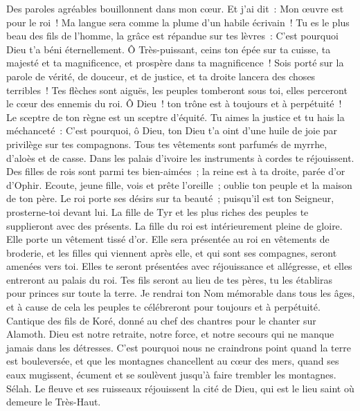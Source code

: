 \begin{multicols}{2}
Des paroles agréables bouillonnent dans mon cœur. Et j'ai dit~: Mon œuvre est pour le roi~! Ma langue sera comme la plume d'un habile écrivain~!
Tu es le plus beau des fils de l'homme, la grâce est répandue sur tes lèvres~: C'est pourquoi Dieu t'a béni éternellement.
Ô Très-puissant, ceins ton épée sur ta cuisse, ta majesté et ta magnificence,
et prospère dans ta magnificence~! Sois porté sur la parole de vérité, de douceur, et de justice, et ta droite lancera des choses terribles~!
Tes flèches sont aiguës, les peuples tomberont sous toi, elles perceront le cœur des ennemis du roi.
Ô Dieu~! ton trône est à toujours et à perpétuité~! Le sceptre de ton règne est un sceptre d'équité.
Tu aimes la justice et tu hais la méchanceté~: C'est pourquoi, ô Dieu, ton Dieu t'a oint d'une huile de joie par privilège sur tes compagnons.
Tous tes vêtements sont parfumés de myrrhe, d'aloès et de casse. Dans les palais d'ivoire les instruments à cordes te réjouissent.
Des filles de rois sont parmi tes bien-aimées~; la reine est à ta droite, parée d'or d'Ophir.
Ecoute, jeune fille, vois et prête l'oreille~; oublie ton peuple et la maison de ton père.
Le roi porte ses désirs sur ta beauté~; puisqu'il est ton Seigneur, prosterne-toi devant lui.
La fille de Tyr et les plus riches des peuples te supplieront avec des présents.
La fille du roi est intérieurement pleine de gloire. Elle porte un vêtement tissé d'or.
Elle sera présentée au roi en vêtements de broderie, et les filles qui viennent après elle, et qui sont ses compagnes, seront amenées vers toi.
Elles te seront présentées avec réjouissance et allégresse, et elles entreront au palais du roi.
Tes fils seront au lieu de tes pères, tu les établiras pour princes sur toute la terre.
Je rendrai ton Nom mémorable dans tous les âges, et à cause de cela les peuples te célébreront pour toujours et à perpétuité.
\VerseOne{}Cantique des fils de Koré, donné au chef des chantres pour le chanter sur Alamoth. 
Dieu est notre retraite, notre force, et notre secours qui ne manque jamais dans les détresses.
C'est pourquoi nous ne craindrons point quand la terre est bouleversée, et que les montagnes chancellent au cœur des mers,
quand ses eaux mugissent, écument et se soulèvent jusqu'à faire trembler les montagnes. Sélah.
Le fleuve et ses ruisseaux réjouissent la cité de Dieu, qui est le lieu saint où demeure le Très-Haut.

\end{multicols}
